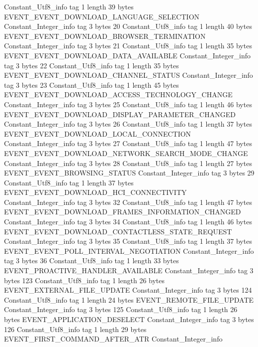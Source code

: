 {{{		}
		Constant_Utf8_info {
			tag	1
			length	39
			bytes	EVENT_EVENT_DOWNLOAD_LANGUAGE_SELECTION
		}
		Constant_Integer_info {
			tag	3
			bytes	20
		}
		Constant_Utf8_info {
			tag	1
			length	40
			bytes	EVENT_EVENT_DOWNLOAD_BROWSER_TERMINATION
		}
		Constant_Integer_info {
			tag	3
			bytes	21
		}
		Constant_Utf8_info {
			tag	1
			length	35
			bytes	EVENT_EVENT_DOWNLOAD_DATA_AVAILABLE
		}
		Constant_Integer_info {
			tag	3
			bytes	22
		}
		Constant_Utf8_info {
			tag	1
			length	35
			bytes	EVENT_EVENT_DOWNLOAD_CHANNEL_STATUS
		}
		Constant_Integer_info {
			tag	3
			bytes	23
		}
		Constant_Utf8_info {
			tag	1
			length	45
			bytes	EVENT_EVENT_DOWNLOAD_ACCESS_TECHNOLOGY_CHANGE
		}
		Constant_Integer_info {
			tag	3
			bytes	25
		}
		Constant_Utf8_info {
			tag	1
			length	46
			bytes	EVENT_EVENT_DOWNLOAD_DISPLAY_PARAMETER_CHANGED
		}
		Constant_Integer_info {
			tag	3
			bytes	26
		}
		Constant_Utf8_info {
			tag	1
			length	37
			bytes	EVENT_EVENT_DOWNLOAD_LOCAL_CONNECTION
		}
		Constant_Integer_info {
			tag	3
			bytes	27
		}
		Constant_Utf8_info {
			tag	1
			length	47
			bytes	EVENT_EVENT_DOWNLOAD_NETWORK_SEARCH_MODE_CHANGE
		}
		Constant_Integer_info {
			tag	3
			bytes	28
		}
		Constant_Utf8_info {
			tag	1
			length	27
			bytes	EVENT_EVENT_BROWSING_STATUS
		}
		Constant_Integer_info {
			tag	3
			bytes	29
		}
		Constant_Utf8_info {
			tag	1
			length	37
			bytes	EVENT_EVENT_DOWNLOAD_HCI_CONNECTIVITY
		}
		Constant_Integer_info {
			tag	3
			bytes	32
		}
		Constant_Utf8_info {
			tag	1
			length	47
			bytes	EVENT_EVENT_DOWNLOAD_FRAMES_INFORMATION_CHANGED
		}
		Constant_Integer_info {
			tag	3
			bytes	34
		}
		Constant_Utf8_info {
			tag	1
			length	46
			bytes	EVENT_EVENT_DOWNLOAD_CONTACTLESS_STATE_REQUEST
		}
		Constant_Integer_info {
			tag	3
			bytes	35
		}
		Constant_Utf8_info {
			tag	1
			length	37
			bytes	EVENT_EVENT_POLL_INTERVAL_NEGOTIATION
		}
		Constant_Integer_info {
			tag	3
			bytes	36
		}
		Constant_Utf8_info {
			tag	1
			length	33
			bytes	EVENT_PROACTIVE_HANDLER_AVAILABLE
		}
		Constant_Integer_info {
			tag	3
			bytes	123
		}
		Constant_Utf8_info {
			tag	1
			length	26
			bytes	EVENT_EXTERNAL_FILE_UPDATE
		}
		Constant_Integer_info {
			tag	3
			bytes	124
		}
		Constant_Utf8_info {
			tag	1
			length	24
			bytes	EVENT_REMOTE_FILE_UPDATE
		}
		Constant_Integer_info {
			tag	3
			bytes	125
		}
		Constant_Utf8_info {
			tag	1
			length	26
			bytes	EVENT_APPLICATION_DESELECT
		}
		Constant_Integer_info {
			tag	3
			bytes	126
		}
		Constant_Utf8_info {
			tag	1
			length	29
			bytes	EVENT_FIRST_COMMAND_AFTER_ATR
		}
		Constant_Integer_info {
}}}
